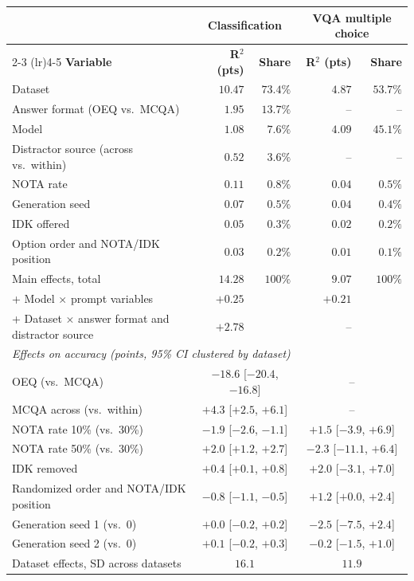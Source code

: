 \begin{tabular}{lrrrr}
\toprule
 & \multicolumn{2}{c}{\textbf{Classification}} & \multicolumn{2}{c}{\textbf{VQA multiple choice}} \\
\cmidrule(lr){2-3} \cmidrule(lr){4-5}
\textbf{Variable} & \textbf{R$^2$ (pts)} & \textbf{Share} & \textbf{R$^2$ (pts)} & \textbf{Share} \\
\midrule
Dataset & $10.47$ & $73.4\%$ & $4.87$ & $53.7\%$ \\
Answer format (OEQ vs.\ MCQA) & $1.95$ & $13.7\%$ & -- & -- \\
Model & $1.08$ & $7.6\%$ & $4.09$ & $45.1\%$ \\
Distractor source (across vs.\ within) & $0.52$ & $3.6\%$ & -- & -- \\
NOTA rate & $0.11$ & $0.8\%$ & $0.04$ & $0.5\%$ \\
Generation seed & $0.07$ & $0.5\%$ & $0.04$ & $0.4\%$ \\
IDK offered & $0.05$ & $0.3\%$ & $0.02$ & $0.2\%$ \\
Option order and NOTA/IDK position & $0.03$ & $0.2\%$ & $0.01$ & $0.1\%$ \\
\midrule
Main effects, total & $14.28$ & $100\%$ & $9.07$ & $100\%$ \\
\quad + Model $\times$ prompt variables & $+0.25$ & & $+0.21$ & \\
\quad + Dataset $\times$ answer format and distractor source & $+2.78$ & & -- & \\
\midrule
\multicolumn{5}{l}{\textit{Effects on accuracy (points, 95\% CI clustered by dataset)}} \\
OEQ (vs.\ MCQA) & \multicolumn{2}{c}{$-18.6$ [$-20.4$, $-16.8$]} & \multicolumn{2}{c}{--} \\
MCQA across (vs.\ within) & \multicolumn{2}{c}{$+4.3$ [$+2.5$, $+6.1$]} & \multicolumn{2}{c}{--} \\
NOTA rate 10\% (vs.\ 30\%) & \multicolumn{2}{c}{$-1.9$ [$-2.6$, $-1.1$]} & \multicolumn{2}{c}{$+1.5$ [$-3.9$, $+6.9$]} \\
NOTA rate 50\% (vs.\ 30\%) & \multicolumn{2}{c}{$+2.0$ [$+1.2$, $+2.7$]} & \multicolumn{2}{c}{$-2.3$ [$-11.1$, $+6.4$]} \\
IDK removed & \multicolumn{2}{c}{$+0.4$ [$+0.1$, $+0.8$]} & \multicolumn{2}{c}{$+2.0$ [$-3.1$, $+7.0$]} \\
Randomized order and NOTA/IDK position & \multicolumn{2}{c}{$-0.8$ [$-1.1$, $-0.5$]} & \multicolumn{2}{c}{$+1.2$ [$+0.0$, $+2.4$]} \\
Generation seed 1 (vs.\ 0) & \multicolumn{2}{c}{$+0.0$ [$-0.2$, $+0.2$]} & \multicolumn{2}{c}{$-2.5$ [$-7.5$, $+2.4$]} \\
Generation seed 2 (vs.\ 0) & \multicolumn{2}{c}{$+0.1$ [$-0.2$, $+0.3$]} & \multicolumn{2}{c}{$-0.2$ [$-1.5$, $+1.0$]} \\
Dataset effects, SD across datasets & \multicolumn{2}{c}{$16.1$} & \multicolumn{2}{c}{$11.9$} \\
\bottomrule
\end{tabular}
